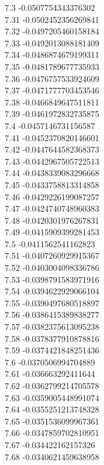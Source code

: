 {7.3	-0.0507754343376302\\
7.31	-0.0502452356269841\\
7.32	-0.0497205460158184\\
7.33	-0.0492013088181409\\
7.34	-0.0486874679199311\\
7.35	-0.0481789677735933\\
7.36	-0.0476757533924609\\
7.37	-0.0471777703453546\\
7.38	-0.0466849647511811\\
7.39	-0.0461972832735875\\
7.4	-0.0457146731156587\\
7.41	-0.0452370820146601\\
7.42	-0.0447644582368373\\
7.43	-0.0442967505722513\\
7.44	-0.0438339083296668\\
7.45	-0.0433758813314858\\
7.46	-0.0429226199087257\\
7.47	-0.0424740748960383\\
7.48	-0.0420301976267831\\
7.49	-0.0415909399281453\\
7.5	-0.0411562541162823\\
7.51	-0.0407260929915367\\
7.52	-0.0403004098336786\\
7.53	-0.0398791583971916\\
7.54	-0.0394622929066104\\
7.55	-0.0390497680518897\\
7.56	-0.0386415389838277\\
7.57	-0.0382375613095238\\
7.58	-0.0378377910878816\\
7.59	-0.0374421848251436\\
7.6	-0.0370506994704889\\
7.61	-0.036663292411644\\
7.62	-0.0362799214705578\\
7.63	-0.0359005448991074\\
7.64	-0.0355251213748328\\
7.65	-0.0351536099967361\\
7.66	-0.0347859702810951\\
7.67	-0.034422162157326\\
7.68	-0.0340621459638958\\
}
